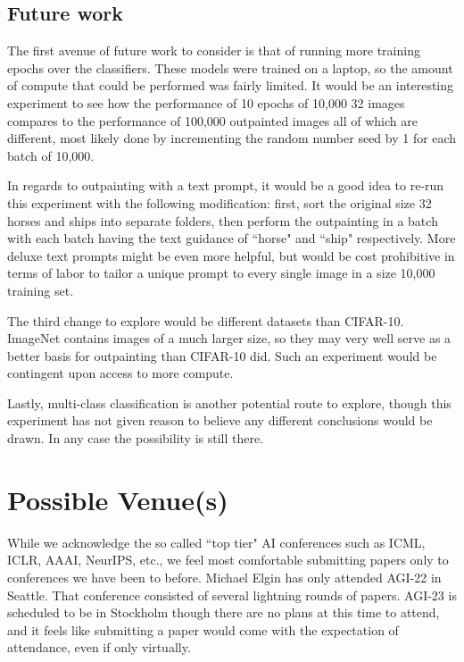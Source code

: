 \documentclass[conference]{IEEEtran}
\begin{document}
\subsection{Future work}

The first avenue of future work to consider is that of running more training epochs over the classifiers. These models were trained on a laptop, so the amount of compute that could be performed was fairly limited. It would be an interesting experiment to see how the performance of 10 epochs of 10,000 32 images compares to the performance of 100,000 outpainted images all of which are different, most likely done by incrementing the random number seed by 1 for each batch of 10,000.

In regards to outpainting with a text prompt, it would be a good idea to re-run this experiment with the following modification: first, sort the original size 32 horses and ships into separate folders, then perform the outpainting in a batch with each batch having the text guidance of ``horse" and ``ship" respectively. More deluxe text prompts might be even more helpful, but would be cost prohibitive in terms of labor to tailor a unique prompt to every single image in a size 10,000 training set.

The third change to explore would be different datasets than CIFAR-10. ImageNet contains images of a much larger size, so they may very well serve as a better basis for outpainting than CIFAR-10 did. Such an experiment would be contingent upon access to more compute.

Lastly, multi-class classification is another potential route to explore, though this experiment has not given reason to believe any different conclusions would be drawn. In any case the possibility is still there.

\section{Possible Venue(s)}

While we acknowledge the so called ``top tier" AI conferences such as ICML, ICLR, AAAI, NeurIPS, etc., we feel most comfortable submitting papers only to conferences we have been to before. Michael Elgin has only attended AGI-22 in Seattle. That conference consisted of several lightning rounds of papers. AGI-23 is scheduled to be in Stockholm though there are no plans at this time to attend, and it feels like submitting a paper would come with the expectation of attendance, even if only virtually.
\end{document}
